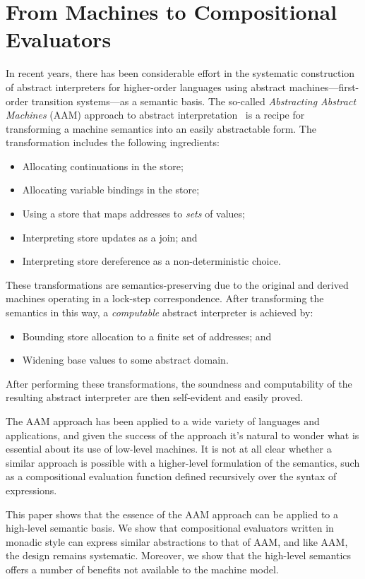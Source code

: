 \section{From Machines to Compositional Evaluators}
\label{s:aam}

In recent years, there has been considerable effort in the systematic
construction of abstract interpreters for higher-order languages using abstract
machines---first-order transition systems---as a semantic basis.  The so-called
\emph{Abstracting Abstract Machines} (AAM) approach to abstract
interpretation~\cite{dvanhorn:VanHorn2010Abstracting} is a recipe for
transforming a machine semantics into an easily abstractable form. The
transformation includes the following ingredients:
\begin{itemize}
\item Allocating continuations in the store;
\item Allocating variable bindings in the store;
\item Using a store that maps addresses to \emph{sets} of values;
\item Interpreting store updates as a join; and
\item Interpreting store dereference as a non-deterministic choice.
\end{itemize}
These transformations are semantics-preserving due to the original and derived
machines operating in a lock-step correspondence.  After transforming the
semantics in this way, a \emph{computable} abstract interpreter is achieved by:
\begin{itemize}
\item Bounding store allocation to a finite set of addresses; and
\item Widening base values to some abstract domain.
\end{itemize}
After performing these transformations, the soundness and computability of the
resulting abstract interpreter are then self-evident and easily proved.

The AAM approach has been applied to a wide variety of languages and
applications, and given the success of the approach it's natural to wonder what
is essential about its use of low-level machines. It is not at all clear
whether a similar approach is possible with a higher-level formulation of the
semantics, such as a compositional evaluation function defined recursively over
the syntax of expressions.

This paper shows that the essence of the AAM approach can be applied to a
high-level semantic basis.  We show that compositional evaluators written in
monadic style can express similar abstractions to that of AAM, and like AAM,
the design remains systematic.  Moreover, we show that the high-level semantics
offers a number of benefits not available to the machine model.  


